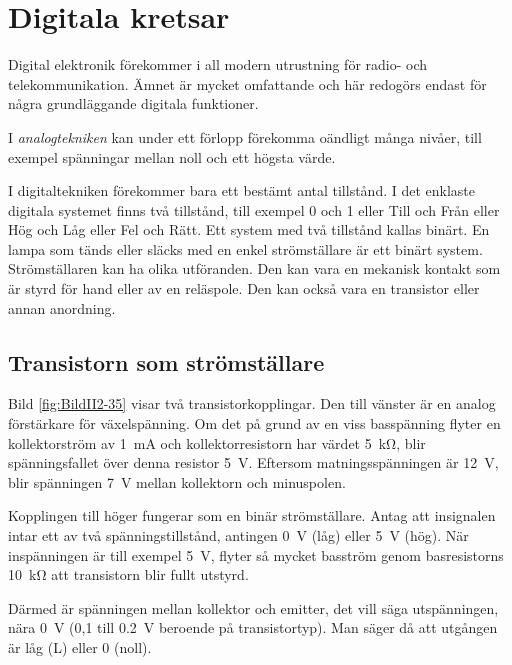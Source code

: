 \section{Digitala kretsar}
\label{digitala kretsar}

Digital elektronik förekommer i all modern utrustning för radio- och telekommunikation. 
Ämnet är mycket omfattande och här redogörs endast för några grundläggande digitala funktioner.

I \emph{analogtekniken} kan under ett förlopp förekomma oändligt många nivåer, till exempel spänningar mellan noll och ett högsta värde.

I digitaltekniken förekommer bara ett bestämt antal tillstånd. I det enklaste digitala systemet finns två tillstånd, till exempel 0 och 1 eller Till och Från eller Hög och Låg eller Fel och Rätt. 
Ett system med två tillstånd kallas binärt. En lampa som tänds eller släcks med en enkel strömställare är ett binärt system. Strömställaren kan ha olika utföranden. Den kan vara en mekanisk kontakt som är styrd för hand eller av en reläspole. Den kan också vara en transistor eller annan anordning.

\subsection{Transistorn som strömställare}


Bild \ref{fig:BildII2-35} visar två transistorkopplingar.
Den till vänster är en analog förstärkare för växelspänning.
Om det på grund av en viss basspänning flyter en kollektorström av
\SI{1}{\milli\ampere} och kollektorresistorn har värdet \SI{5}{\kilo\ohm}, blir
spänningsfallet över denna resistor \SI{5}{\volt}.
Eftersom matningsspänningen är \SI{12}{\volt}, blir spänningen \SI{7}{\volt}
mellan kollektorn och minuspolen.

Kopplingen till höger fungerar som en binär strömställare.
Antag att insignalen intar ett av två spänningstillstånd, antingen
\SI{0}{\volt} (låg) eller \SI{5}{\volt} (hög).
När inspänningen är till exempel \SI{5}{\volt}, flyter så mycket basström genom
basresistorns \SI{10}{\kilo\ohm} att transistorn blir fullt utstyrd.

Därmed är spänningen mellan kollektor och emitter, det vill säga utspänningen,
nära \SI{0}{\volt} (0,1 till \SI{0,2}{\volt} beroende på transistortyp).
Man säger då att utgången är låg (L) eller 0 (noll).

